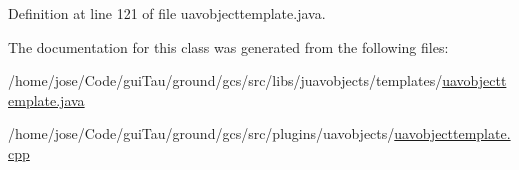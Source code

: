 Definition at line 121 of file uavobjecttemplate.\-java.



The documentation for this class was generated from the following files\-:\begin{DoxyCompactItemize}
\item 
/home/jose/\-Code/gui\-Tau/ground/gcs/src/libs/juavobjects/templates/\hyperlink{uavobjecttemplate_8java}{uavobjecttemplate.\-java}\item 
/home/jose/\-Code/gui\-Tau/ground/gcs/src/plugins/uavobjects/\hyperlink{uavobjecttemplate_8cpp}{uavobjecttemplate.\-cpp}\end{DoxyCompactItemize}

